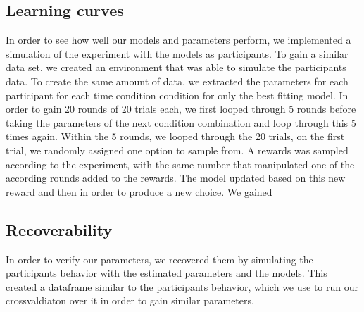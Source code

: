 \subsection{Learning curves}
In order to see how well our models and parameters perform, we implemented a simulation of the experiment with the models as participants. 
To gain a similar data set, we created an environment that was able to simulate the participants data. To create the same amount of data, we extracted the parameters for each participant for each time condition condition for only the best fitting model. 
In order to gain 20 rounds of 20 trials each, we first looped through 5 rounds before taking the parameters of the next condition combination and loop through this 5 times again. Within the 5 rounds, we looped through the 20 trials, on the first trial, we randomly assigned one option to sample from. 
A rewards was sampled according to the experiment, with the same number that manipulated one of the according rounds added to the rewards. The model updated based on this new reward and then in order to produce a new choice. 
We gained 

\subsection{Recoverability}
In order to verify our parameters, we recovered them by simulating the participants behavior with the estimated parameters and the models. This created a dataframe similar to the participants behavior, which we use to run our crossvaldiaton over it in order to gain similar parameters. 


